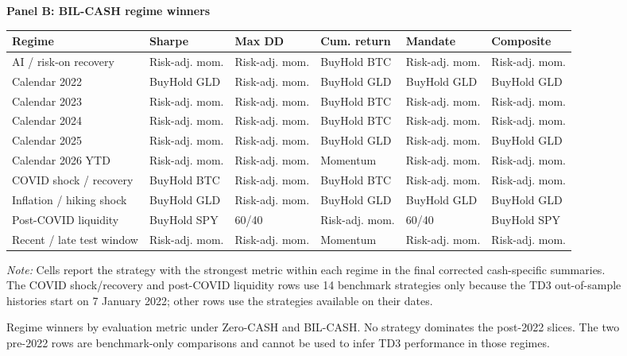 \documentclass[11pt]{article}
\newcommand{\cashzero}{Zero-CASH}
\newcommand{\cashbil}{BIL-CASH}
\begin{document}
\begin{figure}[H]
\vspace{0.8em}
\textbf{Panel B: \cashbil{} regime winners}\\[0.35em]
\begin{adjustbox}{max width=\textwidth}
\begin{tabular}{@{}L{0.22\textwidth} C{0.15\textwidth} C{0.15\textwidth} C{0.15\textwidth} C{0.15\textwidth} C{0.15\textwidth}@{}}
\toprule
Regime & Sharpe & Max DD & Cum. return & Mandate & Composite \\
\midrule
AI / risk-on recovery & Risk-adj. mom. & Risk-adj. mom. & BuyHold BTC & Risk-adj. mom. & Risk-adj. mom. \\
Calendar 2022 & BuyHold GLD & Risk-adj. mom. & BuyHold GLD & BuyHold GLD & BuyHold GLD \\
Calendar 2023 & Risk-adj. mom. & Risk-adj. mom. & BuyHold BTC & Risk-adj. mom. & Risk-adj. mom. \\
Calendar 2024 & Risk-adj. mom. & Risk-adj. mom. & BuyHold BTC & Risk-adj. mom. & Risk-adj. mom. \\
Calendar 2025 & Risk-adj. mom. & Risk-adj. mom. & BuyHold GLD & Risk-adj. mom. & BuyHold GLD \\
Calendar 2026 YTD & Risk-adj. mom. & Risk-adj. mom. & Momentum & Risk-adj. mom. & Risk-adj. mom. \\
COVID shock / recovery & BuyHold BTC & Risk-adj. mom. & BuyHold BTC & Risk-adj. mom. & Risk-adj. mom. \\
Inflation / hiking shock & BuyHold GLD & Risk-adj. mom. & BuyHold GLD & BuyHold GLD & BuyHold GLD \\
Post-COVID liquidity & BuyHold SPY & 60/40 & Risk-adj. mom. & 60/40 & BuyHold SPY \\
Recent / late test window & Risk-adj. mom. & Risk-adj. mom. & Momentum & Risk-adj. mom. & Risk-adj. mom. \\
\bottomrule
\end{tabular}
\end{adjustbox}

\vspace{0.35em}
\parbox{0.94\textwidth}{\footnotesize\emph{Note:} Cells report the strategy with the strongest metric within each regime in the final corrected cash-specific summaries. The COVID shock/recovery and post-COVID liquidity rows use 14 benchmark strategies only because the TD3 out-of-sample histories start on 7 January 2022; other rows use the strategies available on their dates.}
\caption{Regime winners by evaluation metric under \cashzero{} and \cashbil{}. No strategy dominates the post-2022 slices. The two pre-2022 rows are benchmark-only comparisons and cannot be used to infer TD3 performance in those regimes.}
\label{fig:regime-winners}
\end{figure}
\end{document}
